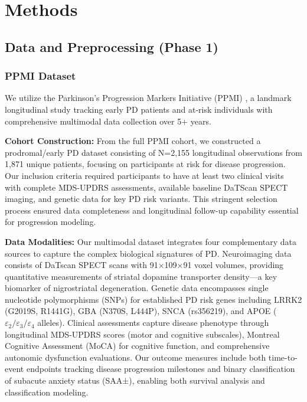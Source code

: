 \documentclass[conference]{IEEEtran}
\begin{document}
\section{Methods}
\label{sec:methods}

\subsection{Data and Preprocessing (Phase 1)}

\subsubsection{PPMI Dataset}
We utilize the Parkinson's Progression Markers Initiative (PPMI) \cite{marek2011ppmi}, a landmark longitudinal study tracking early PD patients and at-risk individuals with comprehensive multimodal data collection over 5+ years.

\textbf{Cohort Construction:} From the full PPMI cohort, we constructed a prodromal/early PD dataset consisting of N=2,155 longitudinal observations from 1,871 unique patients, focusing on participants at risk for disease progression. Our inclusion criteria required participants to have at least two clinical visits with complete MDS-UPDRS assessments, available baseline DaTScan SPECT imaging, and genetic data for key PD risk variants. This stringent selection process ensured data completeness and longitudinal follow-up capability essential for progression modeling.

\textbf{Data Modalities:} Our multimodal dataset integrates four complementary data sources to capture the complex biological signatures of PD. Neuroimaging data consists of DaTscan SPECT scans with 91×109×91 voxel volumes, providing quantitative measurements of striatal dopamine transporter density—a key biomarker of nigrostriatal degeneration. Genetic data encompasses single nucleotide polymorphisms (SNPs) for established PD risk genes including LRRK2 (G2019S, R1441G), GBA (N370S, L444P), SNCA (rs356219), and APOE ($\varepsilon_2 / \varepsilon_3 / \varepsilon_4$ alleles). Clinical assessments capture disease phenotype through longitudinal MDS-UPDRS scores (motor and cognitive subscales), Montreal Cognitive Assessment (MoCA) for cognitive function, and comprehensive autonomic dysfunction evaluations. Our outcome measures include both time-to-event endpoints tracking disease progression milestones and binary classification of subacute anxiety status (SAA±), enabling both survival analysis and classification modeling.
\end{document}
